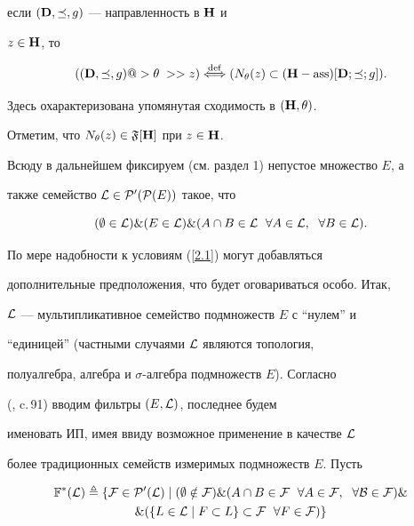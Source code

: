 если $({\bold D},\preceq,g)$ --- направленность в ${\bold H}$ и


$z \in {\bold H}$, то 


$$


(({\bold D},\preceq,g) @>{\theta\;}>> z)


\overset{\mathrm{def}}{\Longleftrightarrow}{}


({N_\theta}(z) \subset ({\bold H}-\ass)[{\bold D};\preceq;g]).


$$


Здесь охарактеризована упомянутая сходимость в $({\bold H},\theta)$.


Отметим, что ${N_\theta}(z) \in {\frak F}[{\bold H}]$ при $z \in


{\bold H}$.





Всюду в дальнейшем фиксируем (см. раздел 1) непустое множество $E$, а


также семейство ${\cal L} \in {\cal P}'({\cal P}(E))$ такое, что


\begin{equation}\label{2.1}


(\emp \in {\cal L}) \& (E \in {\cal L}) \& (A\cap{B} \in


{\cal L}\ \; \fo{A} \in {\cal L},\ \;\fo{B} \in {\cal L}).


\end{equation}


По мере надобности к условиям (\ref{2.1}) могут добавляться


дополнительные предположения, что будет оговариваться особо. Итак,


${\cal L}$ --- мультипликативное семейство подмножеств $E$ с ``нулем'' и


``единицей'' (частными случаями ${\cal L}$ являются топология,


полуалгебра, алгебра и $\sigma$-алгебра подмножеств $E$). Согласно


(\cite{4}, c.\,91) вводим фильтры $(E,{\cal L})$, последнее будем


именовать ИП, имея ввиду возможное применение в качестве ${\cal L}$


более традиционных семейств измеримых подмножеств $E$. Пусть


\begin{multline} \label{2.2}


{{\Bbb F}^*}({\cal L}) \triangleq \{{\cal F} \in {\cal P}'({\cal L}) \mid


(\emp \notin {\cal F}) \& ( A\cap B \in {\cal F}\ \; \fo{A} \in


{\cal F},\ \;\fo{\cal B} \in {\cal F}) \&\\


\& (\{L \in {\cal L} \mid


F \subset L\} \subset {\cal F}\ \; \fo{F} \in {\cal F})\}


\end{multline}



